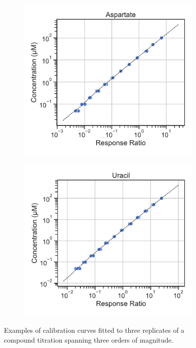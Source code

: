 \begin{figure}[ht]
     \centering
     \begin{subfigure}[b]{0.4\textwidth}
         \includegraphics[width=\textwidth]{figures/chap2/app/calibration_curve_asp.pdf}
     \end{subfigure}
     \hspace{0.035\textwidth}
     \begin{subfigure}[b]{0.4\textwidth}
         \includegraphics[width=\textwidth]{figures/chap2/app/calibration_curve_uracil.pdf}
     \end{subfigure}
        \caption[Isotope dilution calibration curves.]{
        Examples of calibration curves fitted to three replicates of a compound titration spanning three orders of magnitude.
        }
        \label{fig:app_ch2:calibration_curve}
\end{figure}




